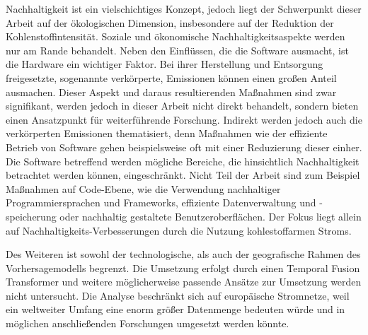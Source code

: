 Nachhaltigkeit ist ein vielschichtiges Konzept, jedoch liegt der Schwerpunkt dieser Arbeit auf der ökologischen Dimension, insbesondere auf der Reduktion der Kohlenstoffintensität.
Soziale und ökonomische Nachhaltigkeitsaspekte werden nur am Rande behandelt.
Neben den Einflüssen, die die Software ausmacht, ist die Hardware ein wichtiger Faktor.
Bei ihrer Herstellung und Entsorgung freigesetzte, sogenannte verkörperte, Emissionen können einen großen Anteil ausmachen.
Dieser Aspekt und daraus resultierenden Maßnahmen sind zwar signifikant, werden jedoch in dieser Arbeit nicht direkt behandelt, sondern bieten einen Ansatzpunkt für weiterführende Forschung.
Indirekt werden jedoch auch die verkörperten Emissionen thematisiert, denn Maßnahmen wie der effiziente Betrieb von Software gehen beispielsweise oft mit einer Reduzierung dieser einher.
Die Software betreffend werden mögliche Bereiche, die hinsichtlich Nachhaltigkeit betrachtet werden können, eingeschränkt.
Nicht Teil der Arbeit sind zum Beispiel Maßnahmen auf Code-Ebene, wie die Verwendung nachhaltiger Programmiersprachen und Frameworks, effiziente Datenverwaltung und -speicherung oder nachhaltig gestaltete Benutzeroberflächen.
Der Fokus liegt allein auf Nachhaltigkeits-Verbesserungen durch die Nutzung kohlestoffarmen Stroms.


Des Weiteren ist sowohl der technologische, als auch der geografische Rahmen des Vorhersagemodells begrenzt.
Die Umsetzung erfolgt durch einen Temporal Fusion Transformer und weitere möglicherweise passende Ansätze zur Umsetzung werden nicht untersucht.
Die Analyse beschränkt sich auf europäische Stromnetze, weil ein weltweiter Umfang eine enorm größer Datenmenge bedeuten würde und in möglichen anschließenden Forschungen umgesetzt werden könnte.
